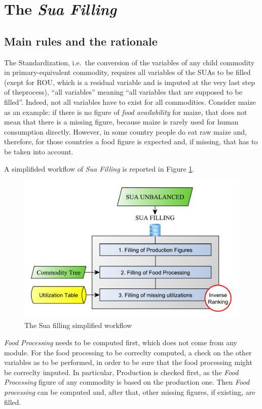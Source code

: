 \documentclass[]{article}
\begin{document}
\section{\texorpdfstring{The \emph{Sua
Filling}}{The Sua Filling}}\label{the-sua-filling}

\subsection*{Main rules and the
rationale}\label{main-rules-and-the-rationale}

The Standardization, i.e.~the conversion of the variables of any child
commodity in primary-equivalent commodity, requires all variables of the
SUAs to be filled (exept for ROU, which is a residual variable and is
imputed at the very last step of theprocess), ``all variables'' meaning
``all variables that are supposed to be filled''. Indeed, not all
variables have to exist for all commodities. Consider maize as an
example: if there is no figure of \emph{food availability} for maize,
that does not mean that there is a missing figure, because maize is
rarely used for human consumption directly. However, in some country
people do eat raw maize and, therefore, for those countries a food
figure is expected and, if missing, that has to be taken into account.

A simplifided workflow of \emph{Sua Filling} is reported in Figure
\ref{fig:f3}.

\begin{figure}[H]

{\centering \includegraphics[width=0.6\linewidth]{images/03_SuaFilling} 

}

\caption{\label{fig:f3}The Sua filling simplified workflow}\label{fig:f3}
\end{figure}

\emph{Food Processing} needs to be computed first, which does not come
from any module. For the food processing to be correclty computed, a
check on the other variables as to be performed, in order to be sure
that the food processing might be correclty imputed. In particular,
Production is checked first, as the \emph{Food Processing} figure of any
commodity is based on the production one. Then \emph{Food processing}
can be computed and, after that, other missing figures, if existing, are
filled.
\end{document}
